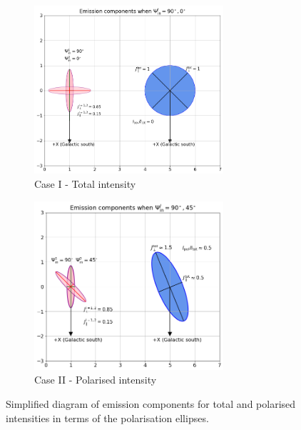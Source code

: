 \documentclass[12pt, a4 paper]{mnras}
\begin{document}
\begin{figure}[h!]
     \centering
     \begin{subfigure}{0.4\textwidth}
         \centering
         \includegraphics[width = 7cm]{Images/Total_intensity_Ellipses_circles_emissions.png}
         \caption{Case I - Total intensity}
         \label{fig_tot_intensity}
     \end{subfigure}
  \hfill
    \begin{subfigure}{0.4\textwidth}
         \centering
         \includegraphics[width = 7cm]{Images/Pol_intensity_Ellipses_circles_emissions.png}
         \caption{Case II - Polarised intensity}
         \label{fig_pol_intensity}
     \end{subfigure}
     \hfill
    \caption{Simplified diagram of emission components for total and polarised intensities in terms of the polarisation ellipses.}
\end{figure}

\end{document}
